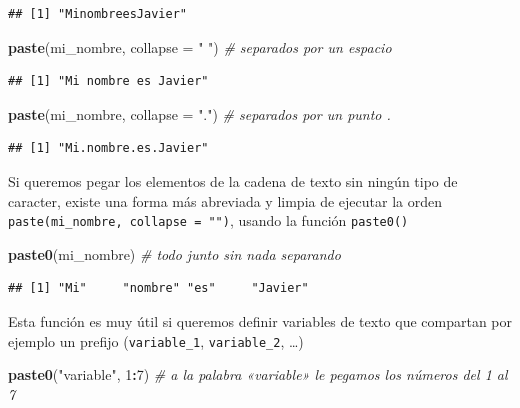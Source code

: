 \documentclass[11pt,]{book}
\newenvironment{Shaded}{\begin{snugshade}}{\end{snugshade}}
\newcommand{\CommentTok}[1]{\textcolor[rgb]{0.37,0.37,0.37}{\textit{#1}}}
\newcommand{\DataTypeTok}[1]{\textcolor[rgb]{0.27,0.27,0.27}{#1}}
\newcommand{\DecValTok}[1]{\textcolor[rgb]{0.06,0.06,0.06}{#1}}
\newcommand{\KeywordTok}[1]{\textcolor[rgb]{0.27,0.27,0.27}{\textbf{#1}}}
\newcommand{\NormalTok}[1]{#1}
\newcommand{\OperatorTok}[1]{\textcolor[rgb]{0.43,0.43,0.43}{\textbf{#1}}}
\newcommand{\StringTok}[1]{\textcolor[rgb]{0.5,0.5,0.5}{#1}}
\begin{document}
\begin{verbatim}
## [1] "MinombreesJavier"
\end{verbatim}

\begin{Shaded}
\begin{Highlighting}[]
\KeywordTok{paste}\NormalTok{(mi_nombre, }\DataTypeTok{collapse =} \StringTok{" "}\NormalTok{) }\CommentTok{# separados por un espacio}
\end{Highlighting}
\end{Shaded}

\begin{verbatim}
## [1] "Mi nombre es Javier"
\end{verbatim}

\begin{Shaded}
\begin{Highlighting}[]
\KeywordTok{paste}\NormalTok{(mi_nombre, }\DataTypeTok{collapse =} \StringTok{"."}\NormalTok{) }\CommentTok{# separados por un punto .}
\end{Highlighting}
\end{Shaded}

\begin{verbatim}
## [1] "Mi.nombre.es.Javier"
\end{verbatim}

Si queremos pegar los elementos de la cadena de texto sin ningún tipo de caracter, existe una forma más abreviada y limpia de ejecutar la orden \texttt{paste(mi\_nombre,\ collapse\ =\ "")}, usando la función \texttt{paste0()}

\begin{Shaded}
\begin{Highlighting}[]
\KeywordTok{paste0}\NormalTok{(mi_nombre) }\CommentTok{# todo junto sin nada separando}
\end{Highlighting}
\end{Shaded}

\begin{verbatim}
## [1] "Mi"     "nombre" "es"     "Javier"
\end{verbatim}

Esta función es muy útil si queremos definir variables de texto que compartan por ejemplo un prefijo (\texttt{variable\_1}, \texttt{variable\_2}, \ldots{})

\begin{Shaded}
\begin{Highlighting}[]
\KeywordTok{paste0}\NormalTok{(}\StringTok{"variable"}\NormalTok{, }\DecValTok{1}\OperatorTok{:}\DecValTok{7}\NormalTok{) }\CommentTok{# a la palabra «variable» le pegamos los números del 1 al 7}
\end{Highlighting}
\end{Shaded}
\end{document}
